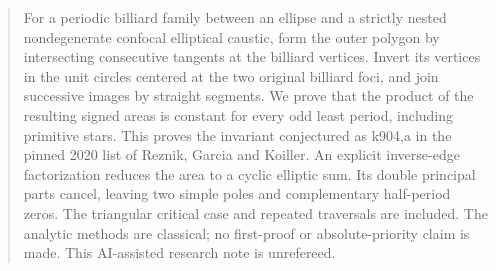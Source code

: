 \begin{abstract}
For a periodic billiard family between an ellipse and a strictly nested nondegenerate confocal elliptical caustic, form the outer polygon by intersecting consecutive tangents at the billiard vertices. Invert its vertices in the unit circles centered at the two original billiard foci, and join successive images by straight segments. We prove that the product of the resulting signed areas is constant for every odd least period, including primitive stars. This proves the invariant conjectured as k904,a in the pinned 2020 list of Reznik, Garcia and Koiller. An explicit inverse-edge factorization reduces the area to a cyclic elliptic sum. Its double principal parts cancel, leaving two simple poles and complementary half-period zeros. The triangular critical case and repeated traversals are included. The analytic methods are classical; no first-proof or absolute-priority claim is made. This AI-assisted research note is unrefereed.
\end{abstract}

